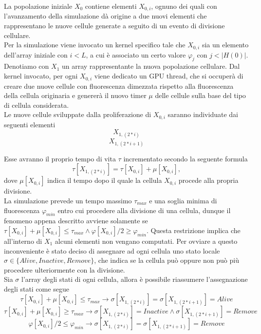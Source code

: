 La popolazione iniziale $X_{0}$ contiene elementi $X_{0,i}$, ognuno dei quali 
con  l'avanzamento della simulazione dà origine a due nuovi elementi che 
rappresentano le nuove cellule generate a seguito di un evento di divisione 
cellulare.
\\
Per la simulazione viene invocato un kernel specifico tale che $X_{0,i}$ sia 
un elemento dell'array iniziale
con $i < L$, a cui è associato un certo valore $\varphi_{j}$
con $j < |H(0)|$. Denotiamo con $X_{1}$ un array rappresentante la nuova
popolazione cellulare.
Dal kernel invocato, per ogni $X_{0,i}$ viene dedicato un GPU thread,
che si occuperà di creare due nuove cellule con fluorescenza dimezzata
rispetto alla fluorescenza della cellula originaria e genererà
il nuovo timer $\mu$ delle cellule sulla base del tipo di cellula considerata.
\\
Le nuove cellule sviluppate dalla proliferazione
di $X_{0, i}$ saranno individuate dai seguenti elementi
$$X_{1, (2 * i)}$$ $$X_{1, (2 * i + 1)}$$

Esse avranno il proprio tempo di vita $\tau$
incrementato secondo la seguente formula
$$\tau[X_{1, (2 * i)}] = \tau[X_{0, i}] + \mu[X_{0, i}],$$
dove $\mu[X_{0, i}]$ indica il tempo dopo il quale la cellula $X_{0,i}$
procede alla propria divisione.
\\
La simulazione prevede un tempo massimo $\tau_{max}$ e una soglia minima 
di fluorescenza $\varphi_{min}$ entro cui procedere
alla divisione di una cellula, dunque il fenomeno appena descritto avviene
solamente se $\tau[X_{0, i}] + \mu[X_{0, i}] \leqslant \tau_{max} \land 
\varphi[X_{0, i}] / 2 \geqslant \varphi_{min}$.
Questa restrizione implica che all'interno di $X_{1}$ alcuni elementi non
vengano computati. Per ovviare a questo inconveniente è stato deciso di
assegnare ad ogni cellula uno stato locale
$\sigma \in \{Alive, Inactive, Remove\}$, che indica se la cellula
può oppure non può più procedere ulteriormente con la divisione.
\\
Sia $\sigma$ l'array degli stati di ogni cellula, allora è possibile riassumere
l'assegnazione degli stati come segue
$$\tau[X_{0, i}] + \mu[X_{0, i}] \leqslant \tau_{max}
\longrightarrow \sigma[X_{1, (2 * i)}] = \sigma[X_{1, (2 * i + 1)}] = Alive$$
$$\tau[X_{0, i}] + \mu[X_{0, i}] \geqslant \tau_{max}
\longrightarrow \sigma[X_{1, (2 * i)}] = Inactive \land
\sigma[X_{1, (2 * i + 1)}] = Remove$$
$$\varphi[X_{0, i}] / 2 \leqslant \varphi_{min}
\longrightarrow \sigma[X_{1, (2 * i)}] = \sigma[X_{1, (2 * i + 1)}] = Remove$$

